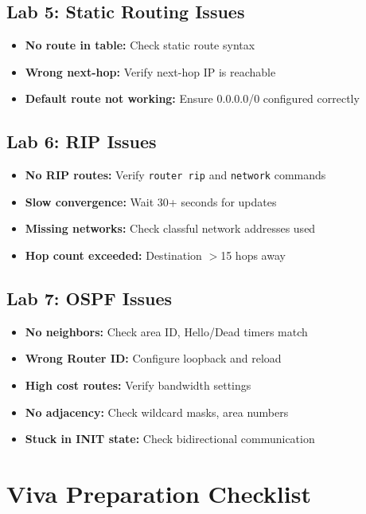 \documentclass[12pt,a4paper]{article}
\begin{document}
\subsection{Lab 5: Static Routing Issues}
\begin{itemize}
    \item \textbf{No route in table:} Check static route syntax
    \item \textbf{Wrong next-hop:} Verify next-hop IP is reachable
    \item \textbf{Default route not working:} Ensure 0.0.0.0/0 configured correctly
\end{itemize}

\subsection{Lab 6: RIP Issues}
\begin{itemize}
    \item \textbf{No RIP routes:} Verify \texttt{router rip} and \texttt{network} commands
    \item \textbf{Slow convergence:} Wait 30+ seconds for updates
    \item \textbf{Missing networks:} Check classful network addresses used
    \item \textbf{Hop count exceeded:} Destination $>$15 hops away
\end{itemize}

\subsection{Lab 7: OSPF Issues}
\begin{itemize}
    \item \textbf{No neighbors:} Check area ID, Hello/Dead timers match
    \item \textbf{Wrong Router ID:} Configure loopback and reload
    \item \textbf{High cost routes:} Verify bandwidth settings
    \item \textbf{No adjacency:} Check wildcard masks, area numbers
    \item \textbf{Stuck in INIT state:} Check bidirectional communication
\end{itemize}

\section{Viva Preparation Checklist}
\end{document}
